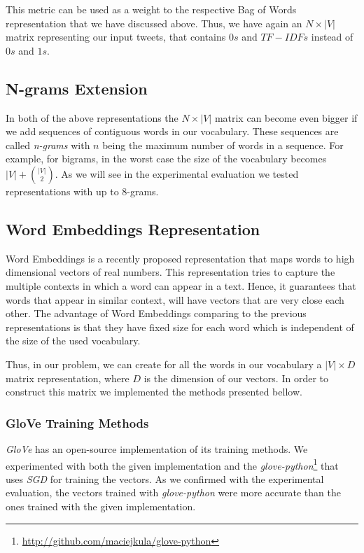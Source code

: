 This metric can be used as a weight to the respective Bag of Words representation that we have discussed above.
 Thus, we have again an $N \times |V|$ matrix representing our input tweets,
 that contains $0s$ and $TF-IDFs$ instead of $0s$ and $1s$.
 
 
   \subsection{N-grams Extension}
 
 In both of the above representations the $N \times |V|$ matrix
 can become even bigger if we add sequences of contiguous words in our vocabulary.
 These sequences are called \textit{n-grams} with $n$ being the maximum number of words in a sequence.  
 For example, for bigrams, in the worst case the size of the vocabulary becomes $|V| + {|V| \choose 2}$.
 As we will see in the experimental evaluation we tested representations with up to 8-grams. 
 
 
 
\subsection{Word Embeddings Representation}
Word Embeddings \cite{DBLP:journals/corr/MikolovSCCD13} is a recently proposed representation that maps words to high dimensional vectors of real numbers. 
This representation tries to capture the multiple contexts in which a word can appear in a text.
Hence, it guarantees that words that appear in similar context, will have vectors that are very close each other.
The advantage of Word Embeddings comparing to the previous representations is that 
they have fixed size for each word which is independent of the size of the used vocabulary.

Thus, in our problem, we can create for all the words in our vocabulary a $|V| \times D$ matrix representation,
where $D$ is the dimension of our vectors.
In order to construct this matrix we implemented the methods presented bellow.


\subsubsection{GloVe Training Methods}
\textit{GloVe} \cite{pennington2014glove} has an open-source implementation of its training methods.
We experimented with both the given implementation and the \textit{glove-python}\footnote{\url{http://github.com/maciejkula/glove-python}} 
that uses \textit{SGD} for training the vectors.
As we confirmed with the experimental evaluation, the vectors trained with \textit{glove-python} were 
more accurate than the ones trained with the given implementation.  


